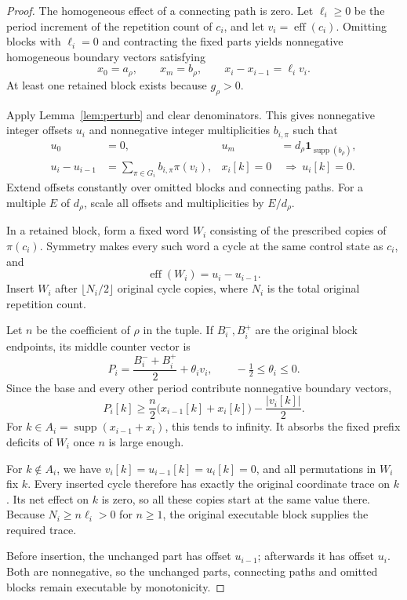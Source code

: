 \documentclass[11pt,a4paper]{article}
\theoremstyle{remark}
\newcommand{\supp}{\operatorname{supp}}
\newcommand{\eff}{\operatorname{eff}}
\newcommand{\one}{\mathbf 1}
\begin{document}
\begin{proof}
The homogeneous effect of a connecting path is zero. Let $\ell_i\ge0$ be the period increment of the repetition count of $c_i$, and let $v_i=\eff(c_i)$. Omitting blocks with $\ell_i=0$ and contracting the fixed parts yields nonnegative homogeneous boundary vectors satisfying
\[
 x_0=a_\rho,\qquad x_m=b_\rho,\qquad x_i-x_{i-1}=\ell_i v_i.
\]
At least one retained block exists because $g_\rho>0$.

Apply Lemma~\ref{lem:perturb} and clear denominators. This gives nonnegative integer offsets $u_i$ and nonnegative integer multiplicities $b_{i,\pi}$ such that
\begin{align*}
 u_0&=0,&u_m&=d_\rho\one_{\supp(b_\rho)},\\
 u_i-u_{i-1}&=\sum_{\pi\in G_i}b_{i,\pi}\pi(v_i),
 &x_i[k]=0&\ \Longrightarrow\ u_i[k]=0.
\end{align*}
Extend offsets constantly over omitted blocks and connecting paths. For a multiple $E$ of $d_\rho$, scale all offsets and multiplicities by $E/d_\rho$.

In a retained block, form a fixed word $W_i$ consisting of the prescribed copies of $\pi(c_i)$. Symmetry makes every such word a cycle at the same control state as $c_i$, and
\[
 \eff(W_i)=u_i-u_{i-1}.
\]
Insert $W_i$ after $\lfloor N_i/2\rfloor$ original cycle copies, where $N_i$ is the total original repetition count.

Let $n$ be the coefficient of $\rho$ in the tuple. If $B_i^-,B_i^+$ are the original block endpoints, its middle counter vector is
\[
 P_i=\frac{B_i^-+B_i^+}{2}+\theta_i v_i,
 \qquad -\tfrac12\le\theta_i\le0.
\]
Since the base and every other period contribute nonnegative boundary vectors,
\begin{equation}\label{eq:buffer}
 P_i[k]\ge\frac n2\bigl(x_{i-1}[k]+x_i[k]\bigr)-\frac{|v_i[k]|}{2}.
\end{equation}
For $k\in A_i=\supp(x_{i-1}+x_i)$, this tends to infinity. It absorbs the fixed prefix deficits of $W_i$ once $n$ is large enough.

For $k\notin A_i$, we have $v_i[k]=u_{i-1}[k]=u_i[k]=0$, and all permutations in $W_i$ fix $k$. Every inserted cycle therefore has exactly the original coordinate trace on $k$. Its net effect on $k$ is zero, so all these copies start at the same value there. Because $N_i\ge n\ell_i>0$ for $n\ge1$, the original executable block supplies the required trace.

Before insertion, the unchanged part has offset $u_{i-1}$; afterwards it has offset $u_i$. Both are nonnegative, so the unchanged parts, connecting paths and omitted blocks remain executable by monotonicity.


\end{proof}
\end{document}
